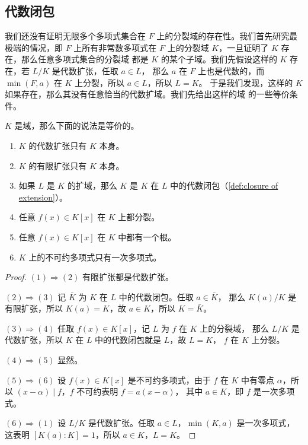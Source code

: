 \subsection{代数闭包}

我们还没有证明无限多个多项式集合在 $F$ 上的分裂域的存在性。我们首先研究最极端的情况，即 $F$
上所有非常数多项式在 $F$ 上的分裂域 $K$，一旦证明了 $K$ 存在，那么任意多项式集合的分裂域
都是 $K$ 的某个子域。我们先假设这样的 $K$ 存在，若 $L/K$ 是代数扩张，任取 $a\in L$，
那么 $a$ 在 $F$ 上也是代数的，而 $\min(F,a)$ 在 $K$ 上分裂，所以 $a\in L$，所以 $L=K$。
于是我们发现，这样的 $K$ 如果存在，那么其没有任意恰当的代数扩域。我们先给出这样的域
的一些等价条件。

\begin{lemma}\label{lemma:TFAE of algebraic closed field}
  $K$ 是域，那么下面的说法是等价的。
  \begin{enumerate}
    \item $K$ 的代数扩张只有 $K$ 本身。
    \item $K$ 的有限扩张只有 $K$ 本身。
    \item 如果 $L$ 是 $K$ 的扩域，那么 $K$ 是 $K$ 在 $L$ 中的代数闭包（\autoref{def:closure of extension}）。 
    \item 任意 $f(x)\in K[x]$ 在 $K$ 上都分裂。
    \item 任意 $f(x)\in K[x]$ 在 $K$ 中都有一个根。
    \item $K$ 上的不可约多项式只有一次多项式。
  \end{enumerate}
\end{lemma}
\begin{proof}
  $(1)\Rightarrow (2)$ 有限扩张都是代数扩张。

  $(2)\Rightarrow (3)$ 记 $\bar K$ 为 $K$ 在 $L$ 中的代数闭包。任取 $a\in\bar K$，
  那么 $K(a)/K$ 是有限扩张，所以 $K(a)=K$，故 $a\in K$，所以 $K=\bar K$。

  $(3)\Rightarrow (4)$ 任取 $f(x)\in K[x]$，记 $L$ 为 $f$ 在 $K$ 上的分裂域，
  那么 $L/K$ 是代数扩张，所以 $K$ 在 $L$ 中的代数闭包就是 $L$，故 $L=K$，
  $f$ 在 $K$ 上分裂。

  $(4)\Rightarrow (5)$ 显然。

  $(5)\Rightarrow (6)$ 设 $f(x)\in K[x]$ 是不可约多项式，由于 $f$ 在 $K$
  中有零点 $\alpha$，所以 $(x-\alpha)\mid f$，$f$ 不可约表明 $f=a(x-\alpha)$，
  其中 $a\in K$，即 $f$ 是一次多项式。

  $(6)\Rightarrow (1)$ 设 $L/K$ 是代数扩张。任取 $a\in L$，$\min(K,a)$ 是一次多项式，
  这表明 $[K(a):K]=1$，所以 $a\in K$，$L=K$。
\end{proof}

